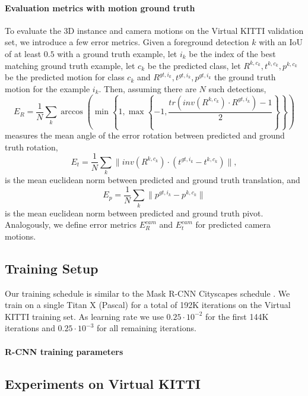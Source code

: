 \paragraph{Evaluation metrics with motion ground truth}
To evaluate the 3D instance and camera motions on the Virtual KITTI validation
set, we introduce a few error metrics.
Given a foreground detection $k$ with an IoU of at least $0.5$ with a ground truth example,
let $i_k$ be the index of the best matching ground truth example,
let $c_k$ be the predicted class,
let $R^{k,c_k}, t^{k,c_k}, p^{k,c_k}$ be the predicted motion for class $c_k$
and $R^{gt,i_k}, t^{gt,i_k}, p^{gt,i_k}$ the ground truth motion for the example $i_k$.
Then, assuming there are $N$ such detections,
\begin{equation}
E_{R} = \frac{1}{N}\sum_k \arccos\left( \min\left\{1, \max\left\{-1, \frac{tr(inv(R^{k,c_k}) \cdot R^{gt,i_k}) - 1}{2} \right\}\right\} \right)
\end{equation}
measures the mean angle of the error rotation between predicted and ground truth rotation,
\begin{equation}
E_{t} = \frac{1}{N}\sum_k  \lVert inv(R^{k,c_k}) \cdot (t^{gt,i_k} - t^{k,c_k}) \rVert,
\end{equation}
is the mean euclidean norm between predicted and ground truth translation, and
\begin{equation}
E_{p} = \frac{1}{N}\sum_k \lVert p^{gt,i_k} - p^{k,c_k} \rVert
\end{equation}
is the mean euclidean norm between predicted and ground truth pivot.
Analogously, we define error metrics $E_{R}^{cam}$ and $E_{t}^{cam}$ for
predicted camera motions.

\subsection{Training Setup}
Our training schedule is similar to the Mask R-CNN Cityscapes schedule \cite{MaskRCNN}.
We train on a single Titan X (Pascal) for a total of 192K iterations on the
Virtual KITTI training set. As learning rate we use $0.25 \cdot 10^{-2}$ for the
first 144K iterations and $0.25 \cdot 10^{-3}$ for all remaining iterations.

\paragraph{R-CNN training parameters}

\subsection{Experiments on Virtual KITTI}

